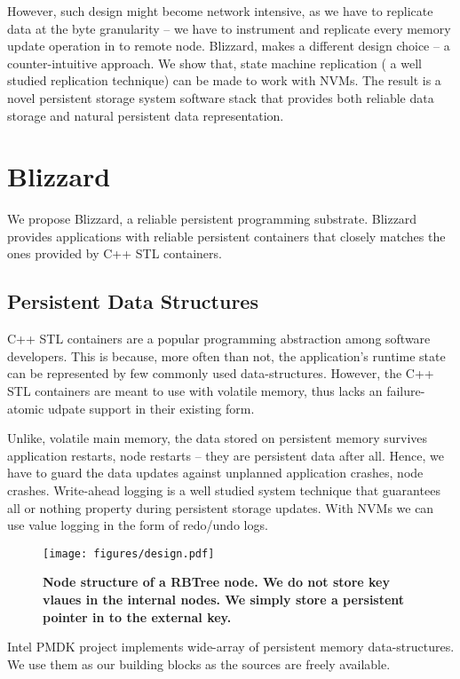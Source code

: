 However, such design might become network intensive, as we have to replicate data at the byte
granularity -- we have to instrument and replicate every memory update operation in to remote node.
Blizzard, makes a different design choice -- a counter-intuitive approach. We show that, state 
machine replication ( a well studied replication technique) can be made to work with NVMs. 
The result is a novel persistent storage system software stack that provides both reliable data
storage and natural persistent data representation.

\section{Blizzard}
We propose Blizzard, a reliable persistent programming substrate. Blizzard provides applications
with reliable persistent containers that closely matches the ones provided by C++ STL containers.

\subsection{Persistent Data Structures}

C++ STL containers are a popular programming abstraction among software developers. This is because,
more often than not, the application's runtime state can be represented by few commonly used 
data-structures.  However, the C++ STL containers are meant to use with volatile memory, thus
lacks an failure-atomic udpate support in their existing form.

Unlike, volatile main memory, the data stored on persistent memory survives application restarts,
node restarts -- they are persistent data after all. Hence, we have to guard the data updates 
against unplanned application crashes, node crashes. Write-ahead logging is a well studied
system technique that guarantees all or nothing property during persistent storage updates.
With NVMs we can use value logging in the form of redo/undo logs.

\begin{figure}[]   
	\centering
	\texttt{[image: figures/design.pdf]} 
	\caption{\bf Node structure of a RBTree node. We do not store key vlaues in the internal nodes. We simply
	store a persistent pointer in to the external key.} 
	\label{fig:zerocopy} 
\end{figure}

Intel PMDK project implements wide-array of persistent memory data-structures. 
We use them as our building blocks as the sources are freely available. 

